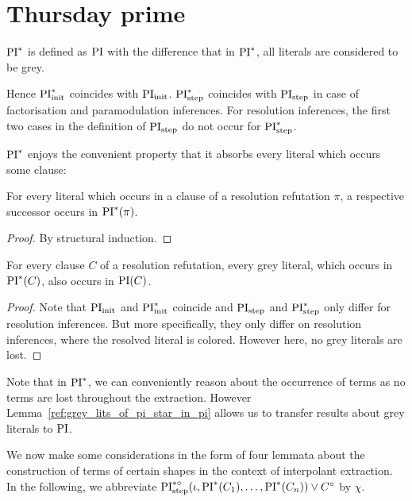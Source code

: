 \documentclass[,%
	draft=false,%
	numbers=noendperiod
	12pt,
	a4paper,
	oneside,%
	openany,
]{memoir}
\newcommand{\inv}{\ensuremath{\chi}}
\begin{document}
\section{Thursday prime}

\begin{defi}[$\PI^*$]
	$\PI^*$ is defined as $\operatorname{PI}$ with the difference that in $\PI^*$, all literals are considered to be grey.
\end{defi}

Hence $\operatorname{PI}_{\mathrm{init}}^*$ coincides with $\operatorname{PI}_{\mathrm{init}}$.
$\operatorname{PI}_{\mathrm{step}}^*$ coincides with $\operatorname{PI}_{\mathrm{step}}$ in case of factorisation and paramodulation inferences.
For resolution inferences, the first two cases in the definition of $\operatorname{PI}_{\mathrm{step}}$ do not occur for $\operatorname{PI}_{\mathrm{step}}^*$.

$\PI^*$ enjoys the convenient property that it absorbs every literal which occurs some clause:

\begin{prop}
	For every literal which occurs in a clause of a resolution refutation $\pi$, a respective successor occurs in $\operatorname{PI}^*(\pi)$.
\end{prop}
\begin{proof}
	By structural induction.
\end{proof}

\begin{lemma}
	\label{ref:grey_lits_of_pi_star_in_pi}
	For every clause $C$ of a resolution refutation,
	every grey literal, which occurs in $\operatorname{PI}^*(C)$, also occurs in $\operatorname{PI}(C)$.
\end{lemma}
\begin{proof}
	Note that $\operatorname{PI}_{\mathrm{init}}$ and $\operatorname{PI}_{\mathrm{init}}^*$ coincide and $\operatorname{PI}_{\mathrm{step}}$ and $\operatorname{PI}_{\mathrm{step}}^*$ only differ for resolution inferences.
	But more specifically, they only differ on resolution inferences, where the resolved literal is colored. However here, no grey literals are lost.
\end{proof}

Note that in $\PI^*$, we can conveniently reason about the occurrence of terms as no terms are lost throughout the extraction.
However Lemma~\ref{ref:grey_lits_of_pi_star_in_pi} allows us to transfer results about grey literals to $\operatorname{PI}$.

We now make some considerations in the form of four lemmata about the construction of terms of certain shapes in the context of interpolant extraction.
In the following, we abbreviate $\operatorname{PI}^{*\circ}_{\mathrm{step}}(\iota, \operatorname{PI}^*(C_1), \dots, \operatorname{PI}^*(C_n)) \lor C^\circ$ by $\inv$.
\end{document}
